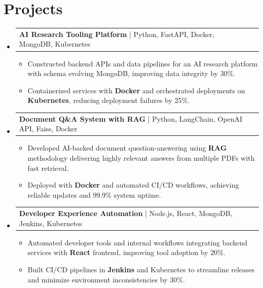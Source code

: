 \documentclass[letterpaper,11pt]{article}
\makeatletter
\newcommand{\resumeItem}[1]{
  \item\footnotesize{
    {#1 \vspace{-2pt}}
  }
}
\newcommand{\resumeProjectHeading}[2]{
    \item
    \begin{tabular*}{1.001\textwidth}{l@{\extracolsep{\fill}}r}
      \small#1 & \textbf{\small #2}\\
    \end{tabular*}\vspace{-7pt}
}
\newcommand{\resumeSubHeadingListStart}{\begin{itemize}[leftmargin=0pt, label={}]}
\newcommand{\resumeSubHeadingListEnd}{\end{itemize}}
\newcommand{\resumeItemListStart}{\begin{itemize}[leftmargin=*]}
\newcommand{\resumeItemListEnd}{\end{itemize}\vspace{-5pt}}
\makeatother
\begin{document}
\section{Projects}
    \vspace{-5pt}
    \resumeSubHeadingListStart

      \resumeProjectHeading
          {\textbf{AI Research Tooling Platform} | Python, FastAPI, Docker, MongoDB, Kubernetes}{ }
        \resumeItemListStart
            \resumeItem{Constructed backend APIs and data pipelines for an AI research platform with schema evolving MongoDB, improving data integrity by 30\%.}
            \resumeItem{Containerized services with \textbf{Docker} and orchestrated deployments on \textbf{Kubernetes}, reducing deployment failures by 25\%.}
        \resumeItemListEnd
        \vspace{-12pt}

      \resumeProjectHeading
          {\textbf{Document Q\&A System with RAG} | Python, LangChain, OpenAI API, Faiss, Docker}{ }
        \resumeItemListStart
            \resumeItem{Developed AI-backed document question-answering using \textbf{RAG} methodology delivering highly relevant answers from multiple PDFs with fast retrieval.}
            \resumeItem{Deployed with \textbf{Docker} and automated CI/CD workflows, achieving reliable updates and 99.9\% system uptime.}
        \resumeItemListEnd
        \vspace{-12pt}

      \resumeProjectHeading
          {\textbf{Developer Experience Automation} | Node.js, React, MongoDB, Jenkins, Kubernetes}{ }
        \resumeItemListStart
            \resumeItem{Automated developer tools and internal workflows integrating backend services with \textbf{React} frontend, improving tool adoption by 20\%.}
            \resumeItem{Built CI/CD pipelines in \textbf{Jenkins} and Kubernetes to streamline releases and minimize environment inconsistencies by 30\%.}
        \resumeItemListEnd

    \resumeSubHeadingListEnd
\end{document}

